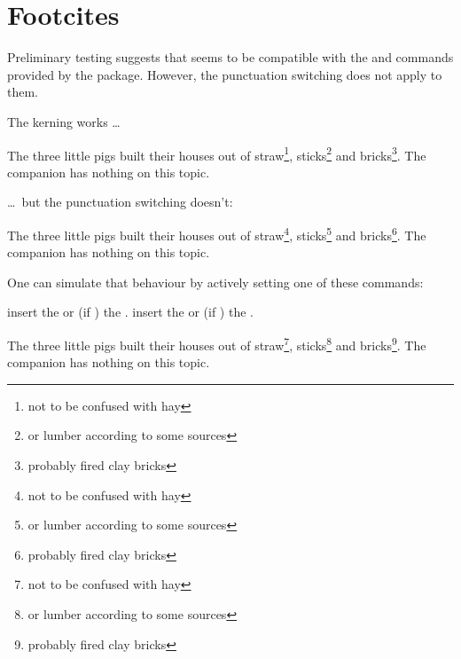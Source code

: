 \documentclass[toc=index,toc=bib]{cnpkgdoc}
\begin{document}
\section{Footcites}
Preliminary testing suggests that \fnpct seems to be compatible with the
 and  commands provided by the 
package. However, the punctuation switching does not apply to them.

The kerning works \ldots
\begin{beispiel}
 \begin{minipage}{.5\linewidth}
  \noindent The three little pigs built their houses
  out of straw\footnote{not to be confused with hay},
  sticks\footnote{or lumber according to some sources}
  and bricks\footnote{probably fired clay bricks}. The
  companion has nothing on this
  topic.
 \end{minipage}
\end{beispiel}

\ldots\ but the punctuation switching doesn't:
\begin{beispiel}
 \begin{minipage}{.5\linewidth}
  \noindent The three little pigs built their houses
  out of straw\footnote{not to be confused with hay},
  sticks\footnote{or lumber according to some sources}
  and bricks\footnote{probably fired clay bricks}. The
  companion has nothing on this topic.
 \end{minipage}
\end{beispiel}

One can simulate that behaviour by actively setting one of these commands:
\begin{beschreibung}
  insert the  or (if )
 the .
  insert the  or (if )
 the .
\end{beschreibung}
\begin{beispiel}
 \begin{minipage}{.5\linewidth}
  \noindent The three little pigs built their houses
  out of straw\footnote{not to be confused with hay},
  sticks\footnote{or lumber according to some sources}
  and bricks\footnote{probably fired clay bricks}. The
  companion has nothing on this topic.\kfp{}
 \end{minipage}
\end{beispiel}
\end{document}
